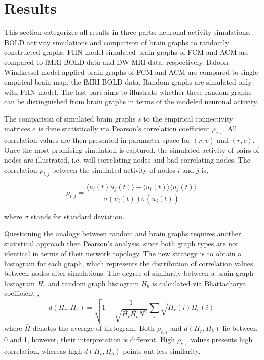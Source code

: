 
\chapter{Results} %

This section categorizes all results in three parts: neuronal activity simulations, BOLD activity simulations and comparison of brain graphs to randomly constructed graphs. FHN model simulated brain graphs of FCM and ACM are compared to fMRI-BOLD data and DW-MRI data, respectively. Baloon-Windkessel model applied brain graphs of FCM and ACM are compared to single empirical brain map, the fMRI-BOLD data. Random graphs are simulated only with FHN model. The last part aims to illustrate whether these random graphs can be distinguished from brain graphs in terms of the modeled neuronal activity.  

The comparison of simulated brain graphs $s$ to the empirical connectivity matrices $e$ is done statistically via Pearson's correlation coefficient $\rho_{e,s}$. All correlation values are then presented in parameter space for $(r,v)$ and $(r,c)$. Once the most promising simulation is captured, the simulated activity of pairs of nodes are illustrated, i.e. well correlating nodes and bad correlating nodes. The correlation $\rho_{i,j}$ between the simulated activity  of nodes $i$ and $j$ is, 

\begin{equation}
\rho_{i,j} = \dfrac{\big \langle u_i(t) u_{j}(t) \big \rangle - \big \langle u_{i}(t) \big \rangle  \big \langle u_{j}(t) \big \rangle}{ \sigma (u_i(t)) \sigma (u_j(t))}
\end{equation}

where $\sigma$ stands for standard deviation.

Questioning the analogy between random and brain graphs requires another statistical approach then Pearson's analysis, since both graph types are not identical in terms of their network topology. The new strategy is to obtain a histogram for each graph, which represents the distribution of correlation values between nodes after simulations. The degree of similarity between a brain graph histogram $H_{r}$ and random graph histogram $H_{b}$ is calculated via Bhattacharya coefficient \citep{XYZ43},
\begin{equation}
d(H_r, H_b) = \sqrt{1- \dfrac{1}{ \sqrt{\bar{H_r} \bar{H_b} N^2}} \sum_{i} \sqrt{H_r(i)H_b(i)} }
\end{equation}
where $\bar{H}$ denotes the average of histogram. Both $\rho_{e,s}$ and $d(H_r, H_b)$ lie between 0 and 1, however, their interpretation is different. High $\rho_{e,s}$ values presents high correlation, whereas high $d(H_r, H_b)$ points out less similarity. 

